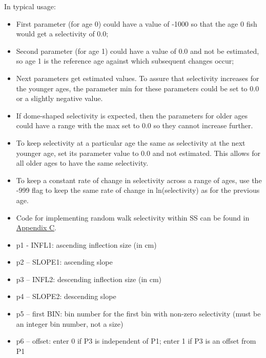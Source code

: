 In typical usage:
	\begin{itemize}
		\item First parameter (for age 0) could have a value of -1000 so that the age 0 fish would get a selectivity of 0.0;
		\item 	Second parameter (for age 1) could have a value of 0.0 and not be estimated, so age 1 is the reference age against which subsequent changes occur;
		\item 	Next parameters get estimated values.  To assure that selectivity increases for the younger ages, the parameter min for these parameters could be set to 0.0 or a slightly negative value.
		\item If dome-shaped selectivity is expected, then the parameters for older ages could have a range with the max set to 0.0 so they cannot increase further.
		\item To keep selectivity at a particular age the same as selectivity at the next younger age, set its parameter value to 0.0 and not estimated.  This allows for all older ages to have the same selectivity.
		\item 	To keep a constant rate of change in selectivity across a range of ages, use the -999 flag to keep the same rate of change in ln(selectivity) as for the previous age.
		\item  Code for implementing random walk selectivity within SS can be found in \hyperlink{RandWalkSelex}{Appendix C}.
	\end{itemize}

	\begin{itemize}
		\item p1 - INFL1:  ascending inflection size (in cm)
		\item p2 – SLOPE1:  ascending slope
		\item p3 – INFL2:  descending inflection size (in cm)
		\item p4 – SLOPE2:  descending slope
		\item p5 – first BIN: bin number for the first bin with non-zero selectivity (must be an integer bin number, not a size)
		\item p6 – offset:  enter 0 if P3 is independent of P1; enter 1 if P3 is an offset from P1
	\end{itemize}

